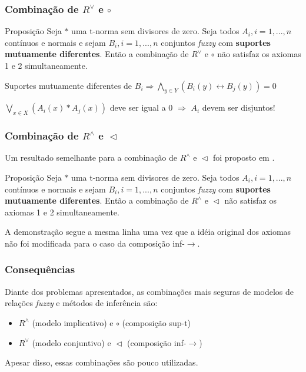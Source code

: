 \documentclass{beamer}
\theoremstyle{definition}
\begin{document}

\begin{frame}
\frametitle{Combinação de $R^{\vee}$ e $\circ$}
\begin{block}{Proposição \cite{p14}}
Seja $\ast$ uma t-norma sem divisores de zero. Seja todos $A_{i}, i=1,...,n$ contínuos e normais e sejam $B_{i}, i=1,...,n$ conjuntos \textit{fuzzy} com \textbf{suportes mutuamente diferentes}. Então a combinação de $R^{\vee}$ e $\circ$ não satisfaz os axiomas 1 e 2 simultaneamente.
\end{block}
Suportes mutuamente diferentes de $B_{i} \Rightarrow \bigwedge\limits_{y \in Y} (B_{i}(y) \leftrightarrow B_{j}(y)) = 0$\par
$\bigvee\limits_{x \in X} (A_{i}(x) \ast A_{j}(x))$ deve ser igual a 0 $\Rightarrow$ $A_{i}$ devem ser disjuntos!
\end{frame}


\begin{frame}
\frametitle{Combinação de $R^{\wedge}$ e $\vartriangleleft$}
Um resultado semelhante para a combinação de $R^{\wedge}$ e $\vartriangleleft$ foi proposto em \cite{p16}.
\begin{block}{Proposição \cite{p16}}
Seja $\ast$ uma t-norma sem divisores de zero. Seja todos $A_{i}, i=1,...,n$ contínuos e normais e sejam $B_{i}, i=1,...,n$ conjuntos \textit{fuzzy} com \textbf{suportes mutuamente diferentes}. Então a combinação de $R^{\wedge}$ e $\vartriangleleft$ não satisfaz os axiomas 1 e 2 simultaneamente.
\end{block}
A demonstração segue a mesma linha uma vez que a idéia original dos axiomas não foi modificada para o caso da composição inf-$\rightarrow$.
\end{frame}


\begin{frame}
\frametitle{Consequências}
Diante dos problemas apresentados, as combinações mais seguras de modelos de relações \textit{fuzzy} e métodos de inferência são:
\begin{itemize}
\item $R^{\wedge}$ (modelo implicativo) e $\circ$ (composição sup-t)
\item $R^{\vee}$ (modelo conjuntivo) e $\vartriangleleft$ (composição inf-$\rightarrow$)
\end{itemize}
Apesar disso, essas combinações são pouco utilizadas.
\end{frame}
\end{document}
